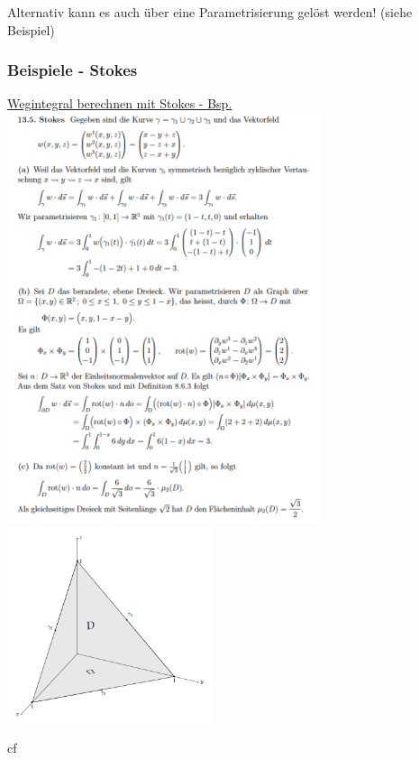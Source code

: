 \documentclass[6pt]{article}
\begin{document}
\begin{multicols*}{3}
		\vspace{5mm}
		
		Alternativ kann es auch {\"u}ber eine Parametrisierung gel{\"o}st werden! (siehe Beispiel)

		\vspace{10mm}
		\quad
		

		\columnbreak
		\subsubsection*{Beispiele - Stokes} 
			\underline{Wegintegral berechnen mit Stokes - Bsp.} \vspace{2mm}\\
			\includegraphics[width=260pt]{images/stokes}
			\includegraphics[width=170pt]{images/stokes2}
	
		
	
	
	

		cf
		
		\vspace{145mm}
		
		\pagebreak

\end{multicols*}
\end{document}
